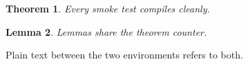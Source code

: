 \documentclass{article}
\newtheorem{thm}{Theorem}
\newtheorem{lem}[thm]{Lemma}
\begin{document}
\begin{thm}Every smoke test compiles cleanly.\end{thm}
\begin{lem}Lemmas share the theorem counter.\end{lem}
Plain text between the two environments refers to both.
\end{document}
